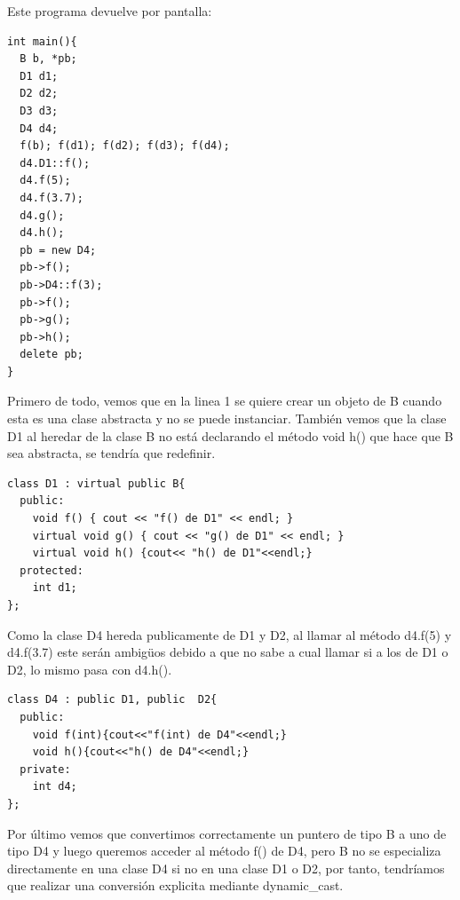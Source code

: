 \newpage
Este programa devuelve por pantalla:
\begin{center}
  \begin{lstlisting}[frame = single]
int main(){
  B b, *pb;
  D1 d1; 
  D2 d2;
  D3 d3;
  D4 d4;
  f(b); f(d1); f(d2); f(d3); f(d4);
  d4.D1::f();
  d4.f(5);
  d4.f(3.7);
  d4.g();
  d4.h();
  pb = new D4;
  pb->f();
  pb->D4::f(3);
  pb->f();
  pb->g();
  pb->h();
  delete pb;
}
  \end{lstlisting}
\end{center}

Primero de todo, vemos que en la linea 1 se quiere crear un objeto de B cuando esta es una clase abstracta y no se puede instanciar.
También vemos que la clase D1 al heredar de la clase B no está declarando el método void h() que hace que B sea abstracta, se tendría que redefinir.

\begin{verbatim}
class D1 : virtual public B{
  public:
    void f() { cout << "f() de D1" << endl; }
    virtual void g() { cout << "g() de D1" << endl; }
    virtual void h() {cout<< "h() de D1"<<endl;}
  protected:
    int d1;
};
\end{verbatim}

Como la clase D4 hereda publicamente de D1 y D2, al llamar al método d4.f(5) y d4.f(3.7) este serán ambigüos debido a que no sabe a cual llamar si a los de D1 o D2, lo mismo pasa con d4.h().
\begin{verbatim}
class D4 : public D1, public  D2{
  public:
    void f(int){cout<<"f(int) de D4"<<endl;}
    void h(){cout<<"h() de D4"<<endl;}
  private:
    int d4;
};
\end{verbatim}

Por último vemos que convertimos correctamente un puntero de tipo B a uno de tipo D4 y luego queremos acceder al método f() de D4, pero B no se especializa directamente en una clase D4 si no en una clase D1 o D2, por tanto, tendríamos que realizar una conversión explicita mediante dynamic\_cast.

